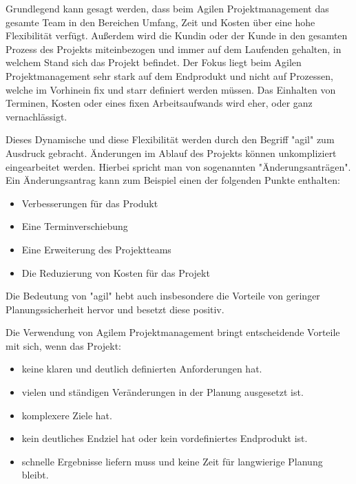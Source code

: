 \label{sec:agile}


Grundlegend kann gesagt werden, dass beim Agilen Projektmanagement das gesamte Team in den Bereichen Umfang, Zeit und Kosten über eine hohe Flexibilität verfügt. Außerdem wird die Kundin oder der Kunde in den gesamten Prozess des Projekts miteinbezogen und immer auf dem Laufenden gehalten, in welchem Stand sich das Projekt befindet. Der Fokus liegt beim Agilen Projektmanagement sehr stark auf dem Endprodukt und nicht auf Prozessen, welche im Vorhinein fix und starr definiert werden müssen. Das Einhalten von Terminen, Kosten oder eines fixen Arbeitsaufwands wird eher, oder ganz vernachlässigt. \cite{agil}

Dieses Dynamische und diese Flexibilität werden durch den Begriff "agil" zum Ausdruck gebracht. Änderungen im Ablauf des Projekts können unkompliziert eingearbeitet werden. Hierbei spricht man von sogenannten "Änderungsanträgen". Ein Änderungsantrag kann zum Beispiel einen der folgenden Punkte enthalten: \cite{agil}

\begin{itemize}
    \item Verbesserungen für das Produkt
    \item Eine Terminverschiebung
    \item Eine Erweiterung des Projektteams
    \item Die Reduzierung von Kosten für das Projekt
\end{itemize}

\cite{Aenderung}

Die Bedeutung von "agil" hebt auch insbesondere die Vorteile von geringer Planungssicherheit hervor und besetzt diese positiv. \cite{agil} 


Die Verwendung von Agilem Projektmanagement bringt entscheidende Vorteile mit sich, wenn das Projekt:

\begin{itemize}
    \item keine klaren und deutlich definierten Anforderungen hat.
    \item vielen und ständigen Veränderungen in der Planung ausgesetzt ist.
    \item komplexere Ziele hat.
    \item kein deutliches Endziel hat oder kein vordefiniertes Endprodukt ist.
    \item schnelle Ergebnisse liefern muss und keine Zeit für langwierige Planung bleibt.
\end{itemize}

